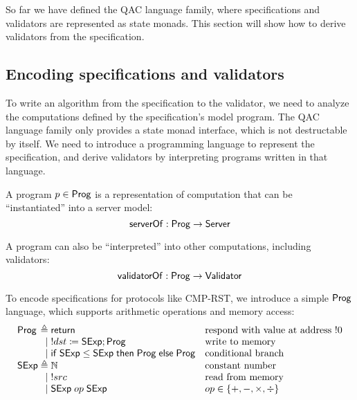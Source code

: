 So far we have defined the QAC language family, where specifications and
validators are represented as state monads.  This section will show how to
derive validators from the specification.

\subsection{Encoding specifications and validators}
To write an algorithm from the specification to the validator, we need to
analyze the computations defined by the specification's model program.  The QAC
language family only provides a state monad interface, which is not destructable
by itself.  We need to introduce a programming language to represent the
specification, and derive validators by interpreting programs written in that
language.

\begin{definition}
  A program $p\in\mathsf{Prog}$ is a representation of computation that can be
  ``instantiated'' into a server model:
  \[\mathsf{serverOf}:\mathsf{Prog}\to\mathsf{Server}\]
  
  A program can also be ``interpreted'' into other computations, including
  validators:
  \[\mathsf{validatorOf}:\mathsf{Prog}\to\mathsf{Validator}\]
\end{definition}
To encode specifications for protocols like CMP-RST, we introduce a simple
$\mathsf{Prog}$ language, which supports arithmetic operations and memory access:
\[\begin{array}{l@{\;}r@{\;}ll}
\Prog&\triangleq&\Return&\text{respond with value at address $!0$}\\
&\mid&!dst\coloneqq\Sexp;\Prog&\text{write to memory}\\\null
&\mid&\If\Sexp\le\Sexp\Then\Prog\Else\Prog&\text{conditional branch}\\
\Sexp&\triangleq&\Nat&\text{constant number}\\
&\mid&!src&\text{read from memory}\\
&\mid&\Sexp\;op\;\Sexp&op\in\{+,-,\times,\div\}
\end{array}
\]

